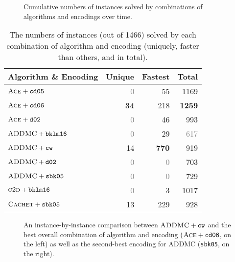 \begin{figure}[t]
  \centering
  \caption{Cumulative numbers of instances solved by combinations of algorithms
    and encodings over time.}\label{fig:cumulative}
\end{figure}

\begin{table}[t]
  \centering
  \begin{tabular}{lrrr}
    \toprule
    Algorithm \& Encoding & Unique & Fastest & Total \\
    \midrule
    $\textsc{Ace} + \texttt{cd05}$ & \textcolor{gray}{0} & 55 & 1169 \\
    $\textsc{Ace} + \texttt{cd06}$ & \textbf{34} & 218 & \textbf{1259} \\
    $\textsc{Ace} + \texttt{d02}$ & \textcolor{gray}{0} & 46 & 993 \\
    $\textsc{ADDMC} + \texttt{bklm16}$ & \textcolor{gray}{0} & 29 & \textcolor{gray}{617} \\
    $\textsc{ADDMC} + \texttt{cw}$ & 14 & \textbf{770} & 919 \\
    $\textsc{ADDMC} + \texttt{d02}$ & \textcolor{gray}{0} & \textcolor{gray}{0} & 703 \\
    $\textsc{ADDMC} + \texttt{sbk05}$ & \textcolor{gray}{0} & \textcolor{gray}{0} & 729 \\
    $\textsc{c2d} + \texttt{bklm16}$ & \textcolor{gray}{0} & 3 & 1017 \\
    $\textsc{Cachet} + \texttt{sbk05}$ & 13 & 229 & 928 \\
    \bottomrule
  \end{tabular}
  \caption{The numbers of instances (out of 1466) solved by each combination of
    algorithm and encoding (uniquely, faster than others, and in
    total).}\label{tbl:tallies}
\end{table}

\begin{figure}[t]
  \centering
  \caption{An instance-by-instance comparison between
    $\textsc{ADDMC} + \texttt{cw}$ and the best overall combination of algorithm
    and encoding ($\textsc{Ace} + \texttt{cd06}$, on the left) as well as the
    second-best encoding for \textsc{ADDMC} (\texttt{sbk05}, on the
    right).}\label{fig:scatter}
\end{figure}

